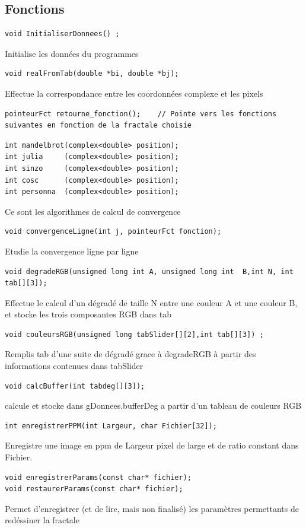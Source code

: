 \documentclass[a4paper,11pt]{article} \usepackage[T1]{fontenc} \usepackage[utf8]{inputenc} \usepackage[francais]{babel}
\begin{document}
\subsection{Fonctions }
\begin{lstlisting}
void InitialiserDonnees() ;
\end{lstlisting}
Initialise les données du programmes
\begin{lstlisting}
void realFromTab(double *bi, double *bj);
\end{lstlisting}
Effectue la correspondance entre les coordonnées complexe et les pixels
\begin{lstlisting}
pointeurFct retourne_fonction();    // Pointe vers les fonctions suivantes en fonction de la fractale choisie
\end{lstlisting}
\begin{lstlisting}
int mandelbrot(complex<double> position);
int julia     (complex<double> position);
int sinzo     (complex<double> position);
int cosc      (complex<double> position);
int personna  (complex<double> position);
\end{lstlisting}
Ce sont les algorithmes de calcul de convergence
\begin{lstlisting}
void convergenceLigne(int j, pointeurFct fonction);
\end{lstlisting}
Etudie la convergence ligne par ligne
\begin{lstlisting}
void degradeRGB(unsigned long int A, unsigned long int  B,int N, int tab[][3]);
\end{lstlisting}
Effectue le calcul d'un dégradé de taille N entre une couleur A et une couleur B, et stocke les trois composantes RGB dans tab
\begin{lstlisting}
void couleursRGB(unsigned long tabSlider[][2],int tab[][3]) ;
\end{lstlisting}
Remplis tab d'une suite de dégradé grace à degradeRGB à partir des informations contenues dans tabSlider
\begin{lstlisting}
void calcBuffer(int tabdeg[][3]);
\end{lstlisting}
calcule et stocke dans gDonnees.bufferDeg a partir d'un tableau de couleurs RGB
\begin{lstlisting}
int enregistrerPPM(int Largeur, char Fichier[32]);
\end{lstlisting}
Enregistre une image en ppm de Largeur pixel de large et de ratio constant dans Fichier.
\begin{lstlisting}
void enregistrerParams(const char* fichier);
void restaurerParams(const char* fichier);
\end{lstlisting}
Permet d'enregistrer (et de lire, mais non finalisé) les paramètres permettants de redéssiner la fractale
\end{document}
